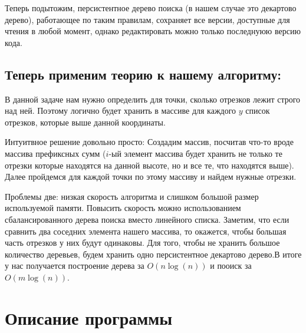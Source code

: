 \documentclass[12pt]{article}
\begin{document}
Теперь подытожим, персистентное дерево поиска (в нашем случае это декартово дерево), работающее по таким правилам, сохраняет все версии, доступные для чтения в любой момент, однако редактировать можно только последнуюю версию кода. 

\subsection*{Теперь применим теорию к нашему алгоритму: }
В данной задаче нам нужно определить для точки, сколько отрезков лежит строго над ней. Поэтому логично будет хранить в массиве для каждого $y$ список отрезков, которые выше данной координаты.

Интуитвное решение довольно просто: Создадим массив, посчитав что-то вроде массива префиксных сумм ($i$-ый элемент массива будет хранить не только те отрезки которые находятся на данной высоте, но и все те, что находятся выше). Далее пройдемся для каждой точки по этому массиву и найдем нужные отрезки.

Проблемы две: низкая скорость алгоритма и слишком большой размер используемой памяти. Повысить скорость можно использованием сбалансированного дерева поиска вместо линейного списка. Заметим, что если сравнить два соседних элемента нашего массива, то окажется, чтобы большая часть отрезков у них будут одинаковы. Для того, чтобы не хранить большое количество деревьев, будем хранить одно персистентное декартово дерево.В итоге у нас получается построение дерева за $O(n \log(n))$ и пооиск за $O(m \log(n))$.

\newpage
\section*{Описание программы}
\end{document}
